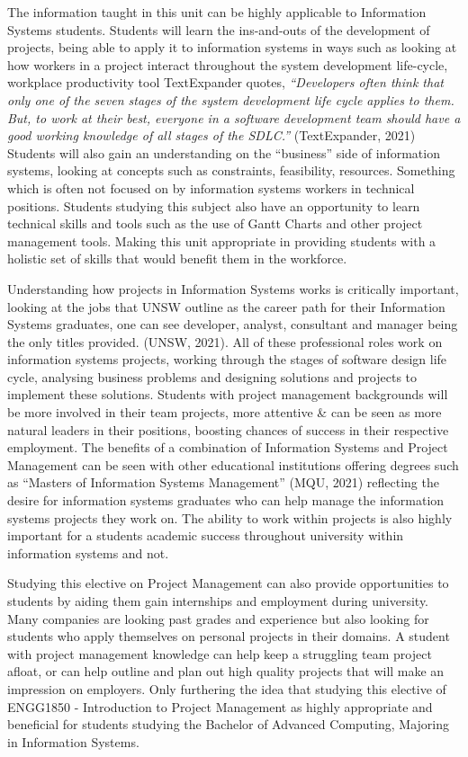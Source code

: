 The information taught in this unit can be highly applicable to Information Systems students. Students will learn the ins-and-outs of the development of projects, being able to apply it to information systems in ways such as looking at how workers in a project interact throughout the system development life-cycle, workplace productivity tool TextExpander quotes, \textit{“Developers often think that only one of the seven stages of the system development life cycle applies to them. But, to work at their best, everyone in a software development team should have a good working knowledge of all stages of the SDLC.”} (TextExpander, 2021) Students will also gain an understanding on the “business” side of information systems, looking at concepts such as constraints, feasibility, resources. Something which is often not focused on by information systems workers in technical positions. Students studying this subject also have an opportunity to learn technical skills and tools such as the use of Gantt Charts and other project management tools. Making this unit appropriate in providing students with a holistic set of skills that would benefit them in the workforce.


Understanding how projects in Information Systems works is critically important, looking at the jobs that UNSW outline as the career path for their Information Systems graduates, one can see developer, analyst, consultant and manager being the only titles provided. (UNSW, 2021). All of these professional roles work on information systems projects, working through the stages of software design life cycle, analysing business problems and designing solutions and projects to implement these solutions. Students with project management backgrounds will be more involved in their team projects, more attentive & can be seen as more natural leaders in their positions, boosting chances of success in their respective employment. The benefits of a combination of Information Systems and Project Management can be seen with other educational institutions offering degrees such as “Masters of Information Systems Management” (MQU, 2021) reflecting the desire for information systems graduates who can help manage the information systems projects they work on. The ability to work within projects is also highly important for a students academic success throughout university within information systems and not.



Studying this elective on Project Management can also provide opportunities to students by aiding them gain internships and employment during university. Many companies are looking past grades and experience but also looking for students who apply themselves on personal projects in their domains. A student with project management knowledge can help keep a struggling team project afloat, or can help outline and plan out high quality projects that will make an impression on employers. Only furthering the idea that studying this elective of ENGG1850 - Introduction to Project Management as highly appropriate and beneficial for students studying the Bachelor of Advanced Computing, Majoring in Information Systems.



